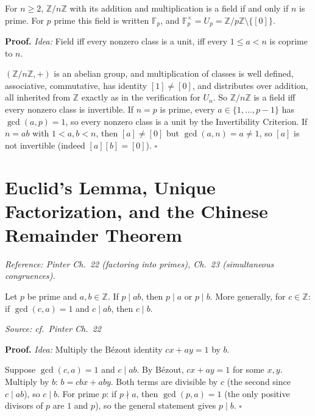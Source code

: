 \documentclass[11pt]{report}
\renewenvironment{proof}[1][Proof]{\noindent\textbf{#1.} }{\hfill$\square$\par\vspace{5pt}}
\newcommand{\srcline}[1]{\par\hfill{\footnotesize\textit{Source: #1}}}
\begin{document}
\begin{propbox}\label{prop:z-nz-field-if-only-if-n-prime}
For $n \geq 2$, $\mathbb{Z}/n\mathbb{Z}$ with its addition and multiplication is a field if and only if $n$ is prime. For $p$ prime this field is written $\mathbb{F}_p$, and $\mathbb{F}_p^\times = U_p = \mathbb{Z}/p\mathbb{Z} \setminus \{[0]\}$.
\end{propbox}

\begin{proof}
\textit{Idea:} Field iff every nonzero class is a unit, iff every $1 \leq a < n$ is coprime to $n$.\par
$(\mathbb{Z}/n\mathbb{Z}, +)$ is an abelian group, and multiplication of classes is well defined, associative, commutative, has identity $[1] \neq [0]$, and distributes over addition, all inherited from $\mathbb{Z}$ exactly as in the verification for $U_n$. So $\mathbb{Z}/n\mathbb{Z}$ is a field iff every nonzero class is invertible. If $n = p$ is prime, every $a \in \{1, \ldots, p-1\}$ has $\gcd(a, p) = 1$, so every nonzero class is a unit by the Invertibility Criterion. If $n = ab$ with $1 < a, b < n$, then $[a] \neq [0]$ but $\gcd(a, n) = a \neq 1$, so $[a]$ is not invertible (indeed $[a][b] = [0]$).
\end{proof}

\section{Euclid's Lemma, Unique Factorization, and the Chinese Remainder Theorem}\label{sec:crt}

\textit{Reference: Pinter Ch.\ 22 (factoring into primes), Ch.\ 23 (simultaneous congruences).}

\begin{lembox}\label{lem:euclids-lemma}
Let $p$ be prime and $a, b \in \mathbb{Z}$. If $p \mid ab$, then $p \mid a$ or $p \mid b$. More generally, for $c \in \mathbb{Z}$: if $\gcd(c, a) = 1$ and $c \mid ab$, then $c \mid b$.
\srcline{cf.\ Pinter Ch.\ 22}
\end{lembox}

\begin{proof}
\textit{Idea:} Multiply the B\'ezout identity $cx + ay = 1$ by $b$.\par
Suppose $\gcd(c, a) = 1$ and $c \mid ab$. By B\'ezout, $cx + ay = 1$ for some $x, y$. Multiply by $b$: $b = cbx + aby$. Both terms are divisible by $c$ (the second since $c \mid ab$), so $c \mid b$. For prime $p$: if $p \nmid a$, then $\gcd(p, a) = 1$ (the only positive divisors of $p$ are $1$ and $p$), so the general statement gives $p \mid b$.
\end{proof}
\end{document}
